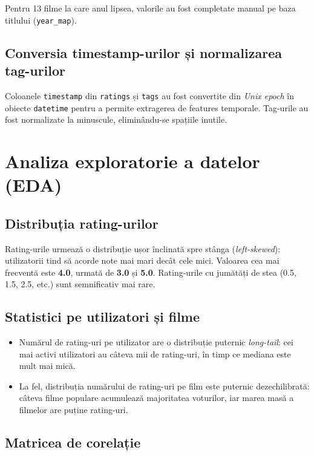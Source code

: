 \documentclass[12pt,a4paper]{article}
\begin{document}
Pentru 13 filme la care anul lipsea, valorile au fost completate manual pe baza titlului (\texttt{year\_map}).

\subsection{Conversia timestamp-urilor și normalizarea tag-urilor}

Coloanele \texttt{timestamp} din \texttt{ratings} și \texttt{tags} au fost convertite din \textit{Unix epoch} în obiecte \texttt{datetime} pentru a permite extragerea de features temporale. Tag-urile au fost normalizate la minuscule, eliminându-se spațiile inutile.

\section{Analiza exploratorie a datelor (EDA)}

\subsection{Distribuția rating-urilor}

Rating-urile urmează o distribuție ușor înclinată spre stânga (\textit{left-skewed}): utilizatorii tind să acorde note mai mari decât cele mici. Valoarea cea mai frecventă este \textbf{4.0}, urmată de \textbf{3.0} și \textbf{5.0}. Rating-urile cu jumătăți de stea (0.5, 1.5, 2.5, etc.) sunt semnificativ mai rare.

\subsection{Statistici pe utilizatori și filme}

\begin{itemize}[noitemsep]
    \item Numărul de rating-uri pe utilizator are o distribuție puternic \textit{long-tail}: cei mai activi utilizatori au câteva mii de rating-uri, în timp ce mediana este mult mai mică.
    \item La fel, distribuția numărului de rating-uri pe film este puternic dezechilibrată: câteva filme populare acumulează majoritatea voturilor, iar marea masă a filmelor are puține rating-uri.
\end{itemize}

\subsection{Matricea de corelație}
\end{document}
